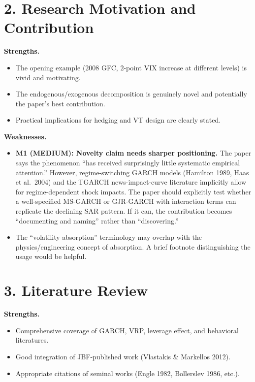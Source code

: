 \documentclass[12pt,a4paper]{article}
\begin{document}
\section*{2. Research Motivation and Contribution}

\textbf{Strengths.}
\begin{itemize}[nosep]
  \item The opening example (2008 GFC, 2-point VIX increase at different levels) is vivid and motivating.
  \item The endogenous/exogenous decomposition is genuinely novel and potentially the paper's best contribution.
  \item Practical implications for hedging and VT design are clearly stated.
\end{itemize}

\textbf{Weaknesses.}
\begin{itemize}[nosep]
  \item \textcolor{warncolor}{\textbf{M1 (MEDIUM): Novelty claim needs sharper positioning.}}  The paper says the phenomenon ``has received surprisingly little systematic empirical attention.''  However, regime-switching GARCH models (Hamilton 1989, Haas et al.\ 2004) and the TGARCH news-impact-curve literature implicitly allow for regime-dependent shock impacts.  The paper should explicitly test whether a well-specified MS-GARCH or GJR-GARCH with interaction terms can replicate the declining SAR pattern.  If it can, the contribution becomes ``documenting and naming'' rather than ``discovering.''
  \item The ``volatility absorption'' terminology may overlap with the physics/engineering concept of absorption.  A brief footnote distinguishing the usage would be helpful.
\end{itemize}

\section*{3. Literature Review}

\textbf{Strengths.}
\begin{itemize}[nosep]
  \item Comprehensive coverage of GARCH, VRP, leverage effect, and behavioral literatures.
  \item Good integration of JBF-published work (Vlastakis \& Markellos 2012).
  \item Appropriate citations of seminal works (Engle 1982, Bollerslev 1986, etc.).
\end{itemize}
\end{document}
